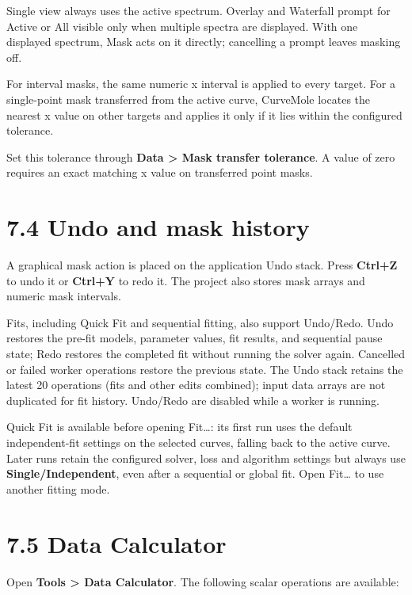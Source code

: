 \documentclass[
  10pt,
  a4paper,
  oneside]{scrreprt}
\begin{document}
Single view always uses the active spectrum. Overlay and Waterfall
prompt for Active or All visible only when multiple spectra are
displayed. With one displayed spectrum, Mask acts on it directly;
cancelling a prompt leaves masking off.

For interval masks, the same numeric x interval is applied to every
target. For a single-point mask transferred from the active curve,
CurveMole locates the nearest x value on other targets and applies it
only if it lies within the configured tolerance.

Set this tolerance through \textbf{Data \textgreater{} Mask transfer
tolerance}. A value of zero requires an exact matching x value on
transferred point masks.

\hypertarget{undo-and-mask-history}{%
\section{7.4 Undo and mask history}\label{undo-and-mask-history}}

A graphical mask action is placed on the application Undo stack. Press
\textbf{Ctrl+Z} to undo it or \textbf{Ctrl+Y} to redo it. The project
also stores mask arrays and numeric mask intervals.

Fits, including Quick Fit and sequential fitting, also support
Undo/Redo. Undo restores the pre-fit models, parameter values, fit
results, and sequential pause state; Redo restores the completed fit
without running the solver again. Cancelled or failed worker operations
restore the previous state. The Undo stack retains the latest 20
operations (fits and other edits combined); input data arrays are not
duplicated for fit history. Undo/Redo are disabled while a worker is
running.

Quick Fit is available before opening Fit\ldots: its first run uses the
default independent-fit settings on the selected curves, falling back to
the active curve. Later runs retain the configured solver, loss and
algorithm settings but always use \textbf{Single/Independent}, even
after a sequential or global fit. Open Fit\ldots{} to use another
fitting mode.

\hypertarget{data-calculator}{%
\section{7.5 Data Calculator}\label{data-calculator}}

Open \textbf{Tools \textgreater{} Data Calculator}. The following scalar
operations are available:
\end{document}
